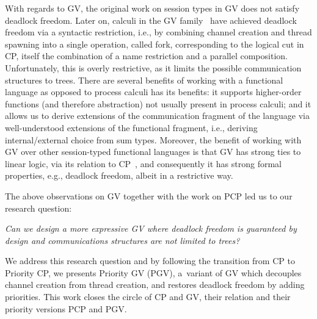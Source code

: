 \documentclass[main.tex]{subfiles}
\begin{document}
With regards to GV, the original work on session types in GV \cite{gayvasconcelos10,gayvasconcelos12} does not satisfy deadlock freedom. Later on, calculi in the GV family~\cite{wadler15,lindleymorris15} have achieved deadlock freedom via a syntactic restriction, i.e., by combining channel creation and thread spawning into a single operation, called fork, corresponding to the logical cut in CP, itself the combination of a name restriction and a parallel composition.
Unfortunately, this is overly restrictive, as it limits the possible communication structures to trees.
There are several benefits of working with a functional language as opposed to process calculi has its benefits: it supports higher-order functions (and therefore abstraction) not usually present in process calculi; and it allows us to derive extensions of the communication fragment of the language via well-understood extensions of the functional fragment, i.e., deriving internal/external choice from sum types. Moreover, the benefit of working with GV over other session-typed functional languages is that GV has strong ties to linear logic, via its relation to CP~\cite{wadler12}, and consequently it has strong formal properties, e.g., deadlock freedom, albeit in a restrictive way.

The above observations on GV together with the work on PCP led us to our research question:

\emph{Can we design a more expressive GV where deadlock freedom is guaranteed by design and communications structures are not limited to trees?}

We address this research question and by following the transition from CP to Priority CP, we presents 
Priority GV (PGV), a~variant of GV which decouples channel creation from thread creation, and restores deadlock freedom by adding priorities. This work closes the circle of CP and GV, their relation and their priority versions PCP and PGV.
\end{document}
